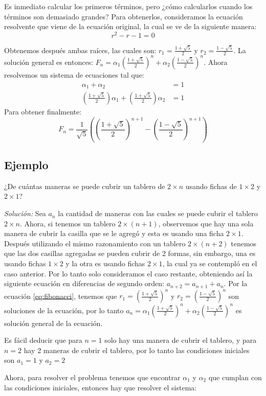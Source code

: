 \documentclass{report}
\begin{document}
Es inmediato calcular los primeros términos, pero ¿cómo calcularlos
cuando los términos son demasiado grandes?  Para obtenerlos,
consideramos la ecuación resolvente que viene de la ecuación original,
la cual se ve de la siguiente manera:
$$r^2-r-1=0$$

Obtenemos después ambas raíces, las cuales son:
$r_{1}= \frac{1+\sqrt{5}}{2}$ y $r_{2}=\frac{1-\sqrt{5}}{2}$. La
solución general es entonces:
$F_{n}=\alpha_{1}(\frac{1+\sqrt{5}}{2})^{n} +
\alpha_{2}(\frac{1-\sqrt{5}}{2})^n$.
Ahora resolvemos un sistema de ecuaciones tal que:
\begin{align*}
\alpha_{1} + \alpha_{2} &= 1\\
(\frac{1+\sqrt{5}}{2})\alpha_{1} + (\frac{1+\sqrt{5}}{2})\alpha_{2}&=1
\end{align*}
Para obtener finalmente:
  $$F_{n} = \frac{1}{\sqrt{5}}((\frac{1+\sqrt{5}}{2})^{n+1}-(\frac{1-\sqrt{5}}{2})^{n+1})$$

\subsection{Ejemplo}
\label{sec:fichas}

¿De cuántas maneras se puede cubrir un tablero de $2\times n$ usando
fichas de $1\times 2$ y $2\times 1$?

\textit{Solución:} Sea $a_n$ la cantidad de maneras con las cuales se
puede cubrir el tablero $2\times n$. Ahora, si tenemos un tablero
$2\times (n+1)$, observemos que hay una sola manera de cubrir la
casilla que se le agregó y esta es usando una ficha $2\times 1$.
Después utilizando el mismo razonamiento con un tablero
$2\times (n+2)$ tenemos que las dos casillas agregadas se pueden
cubrir de 2 formas, sin embargo, una es usando fichas $1\times 2$ y la
otra es usando fichas $2\times 1$, la cual ya se contempló en el caso
anterior. Por lo tanto solo consideramos el caso restante, obteniendo
así la siguiente ecuación en diferencias de segundo orden:
$a_{n+2}=a_{n+1}+a_n$. Por la ecuación \eqref{eq:fibonacci}, tenemos
que $r_1=(\frac{1+\sqrt{5}}{2})^n$ y $r_2=(\frac{1-\sqrt{5}}{2})^n$
son soluciones de la ecuación, por lo tanto
$a_n=\alpha_1(\frac{1+\sqrt{5}}{2})^n +
\alpha_2(\frac{1-\sqrt{5}}{2})^n$ es solución general de la ecuación.


Es fácil deducir que para $n=1$ solo hay una manera de cubrir el
tablero, y para $n=2$ hay 2 maneras de cubrir el tablero, por lo tanto
las condiciones iniciales son $a_1=1$ y $a_2=2$

Ahora, para resolver el problema tenemos que encontrar $\alpha_1$ y
$\alpha_2$ que cumplan con las condiciones iniciales, entonces hay que
resolver el sistema:
\end{document}
